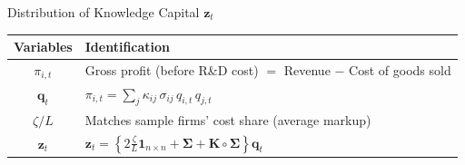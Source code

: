 \documentclass[
  10pt,
  aspectratio=169,   %
]{beamer}
\theoremstyle{plain}
\begin{document}
\begin{frame}{Distribution of Knowledge Capital $\bm{z}_t$}
  \begin{table}[htbp]
    \centering
    \begin{tabular}{cl}
      \toprule
      Variables & Identification                                                                       \\
      \midrule
      $\pi_{i,t}$
                & Gross profit (before R\&D cost)
      $=$ Revenue $-$ Cost of goods sold                                                               \\[6pt]
      $\bm{q}_t$
                &
      $\pi_{i,t}=\displaystyle\sum_{j}\kappa_{ij}\,\sigma_{ij}\,q_{i,t}\,q_{j,t}$                      \\[6pt]
      $\zeta/L$
                & Matches sample firms' cost share (average markup)                                    \\[6pt]
      $\bm{z}_t$
                &
      $\displaystyle \bm{z}_{t}
      =\left\{2\frac{\zeta}{L}\bm{1}_{n\times n}+\bm{\Sigma}+\bm{K}\circ\bm{\Sigma}\right\}\bm{q}_{t}$ \\
      \bottomrule
    \end{tabular}
  \end{table}
\end{frame}
\end{document}
